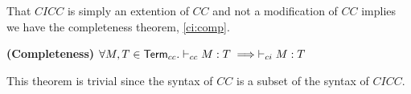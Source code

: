That $CICC$ is simply an extention of $CC$ and not a modification of $CC$ implies we have the completeness theorem, \ref{ci:comp}.

\begin{theorem}
\textbf{(Completeness)}  $\forall M,T \in \mathsf{Term}_{cc}. \vdash_{cc} M : T \implies \vdash_{ci} M : T$
\label{ci:comp}
\end{theorem}

This theorem is trivial since the syntax of $CC$ is a subset of the syntax of $CICC$.

